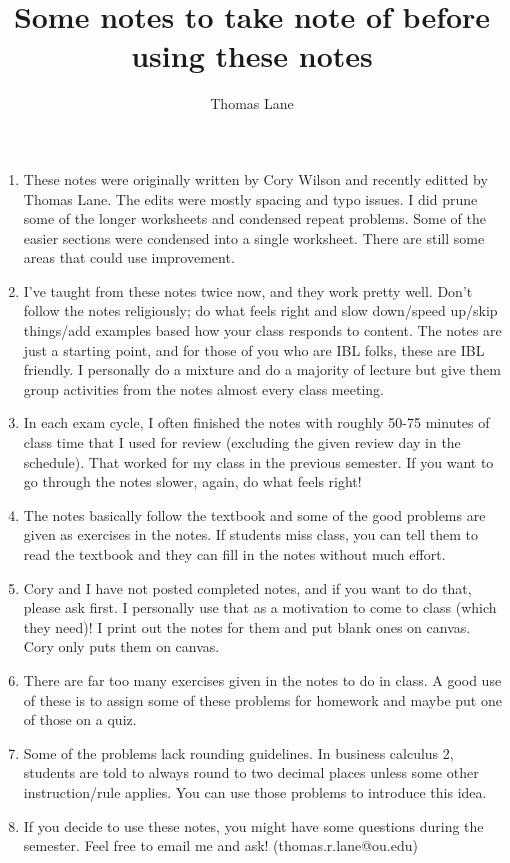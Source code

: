 \documentclass{article}
\title{Some notes to take note of before using these notes}
\author{Thomas Lane}
\begin{document}
\maketitle
\begin{enumerate}
\item These notes were originally written by Cory Wilson and recently editted by Thomas Lane. The edits were mostly spacing and typo issues. I did prune some of the longer worksheets and condensed repeat problems. Some of the easier sections were condensed into a single worksheet. There are still some areas that could use improvement.

\item I've taught from these notes twice now, and they work pretty well. Don't follow the notes religiously; do what feels right and slow down/speed up/skip things/add examples based how your class responds to content. The notes are just a starting point, and for those of you who are IBL folks, these are IBL friendly. I personally do a mixture and do a majority of lecture but give them group activities from the notes almost every class meeting.

\item In each exam cycle, I often finished the notes with roughly 50-75 minutes of class time that I used for review (excluding the given review day in the schedule). That worked for my class in the previous semester. If you want to go through the notes slower, again, do what feels right!

\item The notes basically follow the textbook and some of the good problems are given as exercises in the notes. If students miss class, you can tell them to read the textbook and they can fill in the notes without much effort. 

\item Cory and I have not posted completed notes, and if you want to do that, please ask first. I personally use that as a motivation to come to class (which they need)! I print out the notes for them and put blank ones on canvas. Cory only puts them on canvas.

\item There are far too many exercises given in the notes to do in class. A good use of these is to assign some of these problems for homework and maybe put one of those on a quiz.

\item Some of the problems lack rounding guidelines. In business calculus 2, students are told to always round to two decimal places unless some other instruction/rule applies. You can use those problems to introduce this idea.

\item If you decide to use these notes, you might have some questions during the semester. Feel free to email me and ask! (thomas.r.lane@ou.edu)
\end{enumerate}
\end{document}
